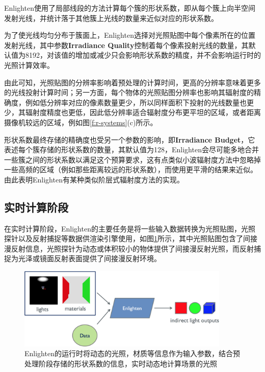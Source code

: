 Enlighten使用了局部线段的方法计算每个簇的形状系数，即从每个簇上向半空间发射光线，并统计落于其他簇上光线的数量来近似对应的形状系数。

为了使光线均匀分布于簇面上，Enlighten选择对光照贴图中每个像素所在的位置发射光线，其中参数\textbf{Irradiance Quality}控制着每个像素投射光线的数量，其默认值为8192，对该值的增加或减少只会影响形状系数的精度，并不会影响运行时的光照计算效率。

由此可知，光照贴图的分辨率影响着预处理的计算时间，更高的分辨率意味着更多的光线投射计算时间；另一方面，每个物体的光照贴图分辨率也影响其辐射度的精确度，例如低分辨率对应的像素数量更少，所以同样面积下投射的光线数量也更少，其辐射度精度也更低，因此低分辨率适合辐射度分布更平坦的区域，或者距离摄像机较远的区域，例如图\ref{f:r-systems}(c)所示。

形状系数最终存储的精确度也受另一个参数的影响，即\textbf{Irradiance Budget}，它表述每个簇存储的形状系数的数量，其默认值为128，Enlighten会尽可能多地合并一些簇之间的形状系数以满足这个预算要求，这有点类似小波辐射度方法中忽略掉一些高频的区域（例如那些距离较远的形状系数），而使用更平滑的结果来近似。由此表明Enlighten有某种类似阶层式辐射度方法的实现。




\subsection{实时计算阶段}
在实时计算阶段，Enlighten的主要任务是将一些输入数据转换为光照贴图，光照探针以及反射捕捉等数据供渲染引擎使用，如图\ref{f:r-enlighten-runtime}所示，其中光照贴图包含了间接漫反射信息，光照探针为动态或体积较小的物体提供了间接漫反射光照，而反射捕捉为光泽或镜面反射表面提供了间接漫反射环境。

 \begin{figure}
	\begin{center}
		\includegraphics[width=0.9\textwidth]{figures/r/path-29-2}
	\end{center}
	\caption{Enlighten的运行时将动态的光照，材质等信息作为输入参数，结合预处理阶段存储的形状系数的信息，实时动态地计算场景的光照}
	\label{f:r-enlighten-runtime}
\end{figure}

